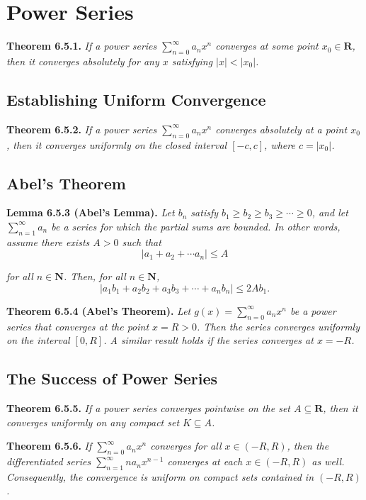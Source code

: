 \documentclass[12pt]{report}
\newcommand{\R}{\textbf{R}}
\newcommand{\N}{\textbf{N}}
\begin{document}
\section{Power Series}

\noindent \textbf{Theorem 6.5.1.} \textit{If a power series $\sum_{n=0}^\infty a_nx^n$ converges at some point $x_0\in\R$, then it converges absolutely for any $x$ satisfying $|x|<|x_0|$.}
\bigskip

\subsection*{Establishing Uniform Convergence}

\noindent \textbf{Theorem 6.5.2.} \textit{If a power series $\sum_{n=0}^\infty a_nx^n$ converges absolutely at a point $x_0$, then it converges uniformly on the closed interval $[-c,c]$, where $c=|x_0|$.}
\bigskip

\subsection*{Abel's Theorem}

\noindent \textbf{Lemma 6.5.3 (Abel's Lemma).} \textit{Let $b_n$ satisfy $b_1\geq b_2\geq b_3\geq\cdots\geq 0$, and let $\sum_{n=1}^\infty a_n$ be a series for which the partial sums are bounded.  In other words, assume there exists $A>0$ such that}
\[|a_1+a_2+\cdots a_n|\leq A\]

\noindent \textit{for all $n\in\N$.  Then, for all $n\in\N$,}
\[|a_1b_1+a_2b_2+a_3b_3+\cdots+a_nb_n|\leq 2Ab_1.\]
\bigskip

\noindent \textbf{Theorem 6.5.4 (Abel's Theorem).} \textit{Let $g(x)=\sum_{n=0}^\infty a_nx^n$ be a power series that converges at the point $x=R>0$.  Then the series converges uniformly on the interval $[0,R]$. A similar result holds if the series converges at $x=-R$.}
\bigskip

\subsection*{The Success of Power Series}

\noindent \textbf{Theorem 6.5.5.} \textit{If a power series converges pointwise on the set $A\subseteq\R$, then it converges uniformly on any compact set $K\subseteq A$.}
\bigskip

\noindent \textbf{Theorem 6.5.6.} \textit{If $\sum_{n=0}^\infty a_nx^n$ converges for all $x\in(-R,R)$, then the differentiated series $\sum_{n=1}^\infty na_nx^{n-1}$ converges at each $x\in(-R,R)$ as well.  Consequently, the convergence is uniform on compact sets contained in $(-R,R)$.}
\bigskip
\end{document}
